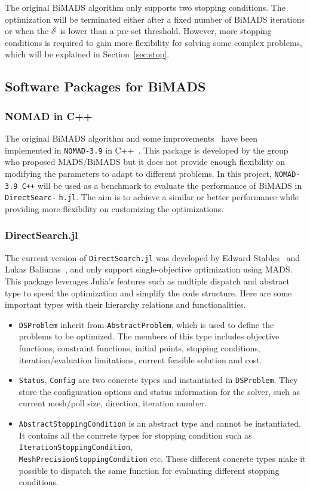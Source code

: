 \documentclass[11pt,oneside,onecolumn,openright]{article}
\begin{document}
    The original BiMADS algorithm only supports two stopping conditions. The optimization will be terminated either after a fixed number of BiMADS iterations or when the $\delta^{\hat{\jmath}}$ is lower than a pre-set threshold. However, more stopping conditions is required to gain more flexibility for solving some complex problems, which will be explained in Section~\ref{sec:stop}.

  \subsection{Software Packages for BiMADS}
    \subsubsection*{NOMAD in C++}
    The original BiMADS algorithm and some improvements~\cite{audet2019mesh,abramson2009orthomads} have been implemented in \verb|NOMAD-3.9| in C++~\cite{le2011algorithm}. This package is developed by the group who proposed MADS/BiMADS but it does not provide enough flexibility on modifying the parameters to adapt to different problems. In this project, \verb|NOMAD-3.9 C++| will be used as a benchmark to evaluate the performance of BiMADS in \verb|DirectSearc-| \verb|h.jl|. The aim is to achieve a similar or better performance while providing more flexibility on customizing the optimizations.

    \subsubsection*{DirectSearch.jl}
    The current version of \verb|DirectSearch.jl| was developed by Edward Stables~\cite{originalMADS} and Lukas Baliunas~\cite{originalMADS2}, and only support single-objective optimization using MADS. This package leverages Julia's features such as multiple dispatch and abstract type to speed the optimization and simplify the code structure. Here are some important types with their hierarchy relations and functionalities.
    \begin{itemize}
    \item \verb|DSProblem| inherit from \verb|AbstractProblem|, which is used to define the problems to be optimized. The members of this type includes objective functions, constraint functions, initial points, stopping conditions, iteration/evaluation limitations, current feasible solution and cost.
    \item \verb|Status|, \verb|Config| are two concrete types and instantiated in \verb|DSProblem|. They store the configuration options and status information for the solver, such as current mesh/poll size, direction, iteration number.
    \item \verb|AbstractStoppingCondition| is an abstract type and cannot be instantiated. It contains all the concrete types for stopping condition such as \verb|IterationStoppingCondition|, \\\verb|MeshPrecisionStoppingCondition| etc. These different concrete types make it possible to dispatch the same function for evaluating different stopping conditions.
    \end{itemize}
\end{document}

